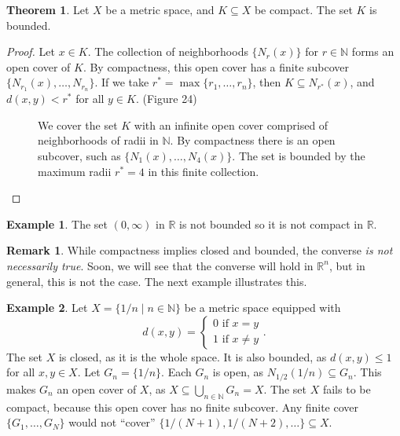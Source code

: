 \documentclass{article}
\newcommand{\N}{\mathbb{N}}
\newcommand{\R}{\mathbb{R}}
\theoremstyle{definition}
\newtheorem{theorem}{Theorem}[section]
\newtheorem{example}{Example}[section]
\newtheorem{remark}{Remark}[section]
\begin{document}
\begin{theorem}
	Let $ X $ be a metric space, and $ K\subseteq X $ be compact. The set $ K $ is bounded. 
\end{theorem}
\begin{proof}
Let $ x\in K $. The collection of neighborhoods $ \{N_r(x)\} $ for $ r\in\N $ forms an open cover of $ K $. By compactness, this open cover has a finite subcover $ \{N_{r_1}(x),\ldots,N_{r_n}\} $. If we take $ r^*=\max\{r_1,\ldots,r_n\} $, then $ K\subseteq N_{r^*}(x) $, and $ d(x,y)<r^* $ for all $ y\in K $. (Figure 24)
  \begin{figure}[h!]
	\centering
	\caption{We cover the set $ K $ with an infinite open cover comprised of neighborhoods of radii in $ \N $. By compactness there is an open subcover, such as $ \{N_1(x),\ldots,N_4(x)\} $. The set is bounded by the maximum radii $ r^*=4 $ in this finite collection.}  
\end{figure}
\end{proof}
\begin{example}
The set $ (0,\infty) $ in $ \R $ is not bounded so it is not compact in $ \R $. 
\end{example}
\begin{remark}
	While compactness implies closed and bounded, the converse \textit{is not necessarily true}. Soon, we will see that the converse will hold in $ \R^n $, but in general, this is not the case. The next example illustrates this.
\end{remark}
\begin{example}
	Let $ X=\{1/n\mid n\in\N\} $ be a metric space equipped with $$ d(x,y)=\begin{cases}
	0\text{ if }x=y\\1\text{ if }x\neq y
	\end{cases}.$$
The set $ X $ is closed, as it is the whole space. It is also bounded, as $ d(x,y)\le 1 $ for all $ x,y\in X $. Let $ G_n=\{1/n\} $. Each $ G_n $ is open, as $ N_{1/2}(1/n)\subseteq G_n $. This makes $ G_n $ an open cover of $ X $, as $ X\subseteq\bigcup_{n\in \N} G_n=X $. The set $ X $ fails to be compact, because this open cover has no finite subcover. Any finite cover $ \{G_{1},\ldots,G_{N}\} $ would not ``cover''  $ \{1/(N+1),1/(N+2),\ldots\}\subseteq X $.	
\end{example}
\end{document}
